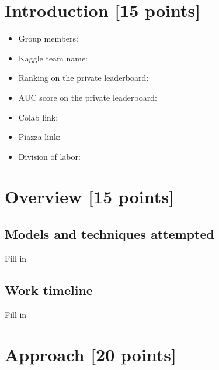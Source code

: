 \newif\ifshowsolutions
\showsolutionstrue





\pagestyle{fancy}




\newpage

\section{Introduction [15 points]}
    \begin{itemize}
        \item Group members:
        \item Kaggle team name:
        \item Ranking on the private leaderboard:
        \item AUC score on the private leaderboard:
        \item Colab link:
        \item Piazza link:
        \item Division of labor:
    \end{itemize} 
\newpage

\section{Overview [15 points]}
\subsection{Models and techniques attempted}
Fill in

\subsection{Work timeline}
Fill in

\newpage

\section{Approach [20 points]}
